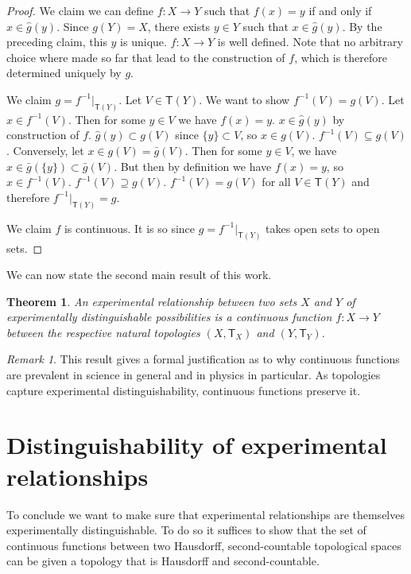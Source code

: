 \documentclass[review]{elsarticle}
\theoremstyle{plain}%
\newtheorem{thm}{Theorem}[section]
\theoremstyle{definition}
\theoremstyle{remark}
\newtheorem*{rem}{Remark}
\begin{document}
\begin{proof}
	We claim we can define $f: X\to Y$ such that $f(x) = y$ if and only if $x\in \hat{g}(y)$. Since $g(Y)=X$, there exists $y\in Y$ such that $x\in\hat{g}(y)$. By the preceding claim, this $y$ is unique. $f: X\to Y$ is well defined. Note that no arbitrary choice where made so far that lead to the construction of $f$, which is therefore determined uniquely by $g$. 
	
	We claim $g = f^{-1} |_{\mathsf{T}(Y)}$. Let $V\in\mathsf{T}(Y)$. We want to show $f^{-1}(V) = g(V)$. Let $x\in f^{-1}(V)$. Then for some $y \in V$ we have $f(x)=y$. $x\in \hat{g}(y)$ by construction of $f$. $\hat{g}(y) \subset g(V)$ since $\{y\}\subset V$, so $x\in g(V)$. $f^{-1}(V) \subseteq g(V)$. Conversely, let $x\in g(V)=\bar{g}(V)$. Then for some $y\in V$, we have $x\in\bar{g}(\{y\})\subset\bar{g}(V)$. But then by definition we have $f(x)=y$, so $x\in f^{-1}(V)$. $f^{-1}(V) \supseteq g(V)$. $f^{-1}(V) = g(V)$ for all $V\in\mathsf{T}(Y)$ and therefore $f^{-1}|_{\mathsf{T}(Y)}=g$.
	
	We claim $f$ is continuous. It is so since $g = f^{-1} |_{\mathsf{T}(Y)}$ takes open sets to open sets. 
\end{proof}

We can now state the second main result of this work.

\begin{thm}
	An experimental relationship between two sets $X$ and $Y$ of experimentally distinguishable possibilities is a continuous function $f : X \rightarrow Y$ between the respective natural topologies $(X,\mathsf{T}_X)$ and $(Y,\mathsf{T}_Y)$. 
\end{thm}

\begin{rem}
	This result gives a formal justification as to why continuous functions are prevalent in science in general and in physics in particular. As topologies capture experimental distinguishability, continuous functions preserve it.
\end{rem}


\section{Distinguishability of experimental relationships}

To conclude we want to make sure that experimental relationships are themselves experimentally distinguishable. To do so it suffices to show that the set of continuous functions between two Hausdorff, second-countable topological spaces can be given a topology that is Hausdorff and second-countable.
\end{document}
